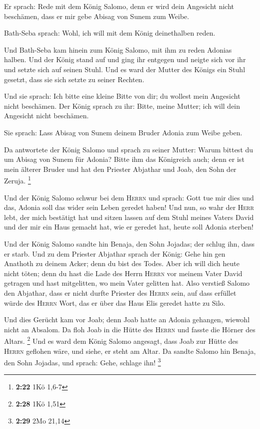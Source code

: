  Er sprach: Rede mit dem König Salomo, denn er wird dein
Angesicht nicht beschämen, dass er mir gebe Abisag von Sunem zum Weibe.

 Bath-Seba sprach: Wohl, ich will mit dem König
deinethalben reden.

 Und Bath-Seba kam hinein zum König Salomo, mit ihm zu
reden Adonias halben. Und der König stand auf und ging ihr entgegen und
neigte sich vor ihr und setzte sich auf seinen Stuhl. Und es ward der
Mutter des Königs ein Stuhl gesetzt, dass sie sich setzte zu seiner
Rechten.

 Und sie sprach: Ich bitte eine kleine Bitte von dir; du
wollest mein Angesicht nicht beschämen. Der König sprach zu ihr: Bitte,
meine Mutter; ich will dein Angesicht nicht beschämen.

 Sie sprach: Lass Abisag von Sunem deinem Bruder Adonia
zum Weibe geben.

 Da antwortete der König Salomo und sprach zu seiner
Mutter: Warum bittest du um Abisag von Sunem für Adonia? Bitte ihm das
Königreich auch; denn er ist mein älterer Bruder und hat den Priester
Abjathar und Joab, den Sohn der Zeruja. \footnote{\textbf{2:22} 1Kö
  1,6-7}

 Und der König Salomo schwur bei dem \textsc{Herrn} und
sprach: Gott tue mir dies und das, Adonia soll das wider sein Leben
geredet haben!  Und nun, so wahr der \textsc{Herr} lebt,
der mich bestätigt hat und sitzen lassen auf dem Stuhl meines Vaters
David und der mir ein Haus gemacht hat, wie er geredet hat, heute soll
Adonia sterben!

 Und der König Salomo sandte hin Benaja, den Sohn
Jojadas; der schlug ihn, dass er starb.  Und zu dem
Priester Abjathar sprach der König: Gehe hin gen Anathoth zu deinem
Acker; denn du bist des Todes. Aber ich will dich heute nicht töten;
denn du hast die Lade des Herrn \textsc{Herrn} vor meinem Vater David
getragen und hast mitgelitten, wo mein Vater gelitten hat.
 Also verstieß Salomo den Abjathar, dass er nicht durfte
Priester des \textsc{Herrn} sein, auf dass erfüllet würde des
\textsc{Herrn} Wort, das er über das Haus Elis geredet hatte zu Silo.

 Und dies Gerücht kam vor Joab; denn Joab hatte an Adonia
gehangen, wiewohl nicht an Absalom. Da floh Joab in die Hütte des
\textsc{Herrn} und fasste die Hörner des Altars. \footnote{\textbf{2:28}
  1Kö 1,51}  Und es ward dem König Salomo angesagt, dass
Joab zur Hütte des \textsc{Herrn} geflohen wäre, und siehe, er steht am
Altar. Da sandte Salomo hin Benaja, den Sohn Jojadas, und sprach: Gehe,
schlage ihn! \footnote{\textbf{2:29} 2Mo 21,14}

